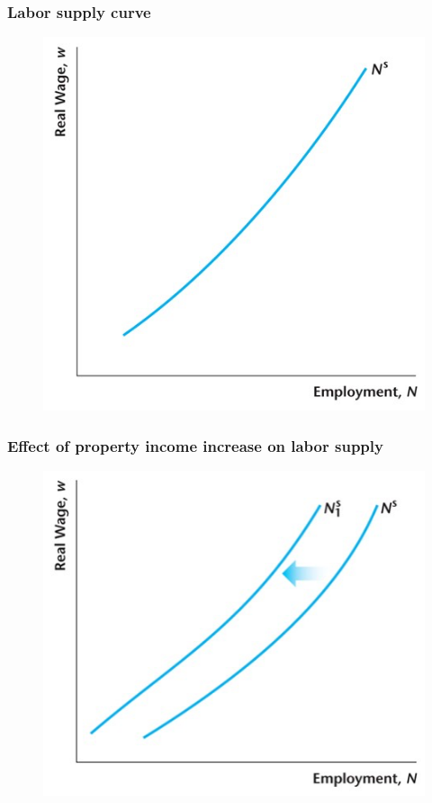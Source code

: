 \documentclass{beamer}
\begin{document}
\begin{frame}
\frametitle[alignment=center]{Labor supply curve}
\begin{figure}
\centering
\includegraphics[scale=0.5]{Figures/W_Fig_4pt9.png}
\end{figure}
\end{frame}


\begin{frame}
\frametitle[alignment=center]{Effect of property income increase on labor supply}
\begin{figure}
\centering
\includegraphics[scale=0.5]{Figures/W_Fig_4pt10.png}
\end{figure}
\end{frame}
\end{document}
